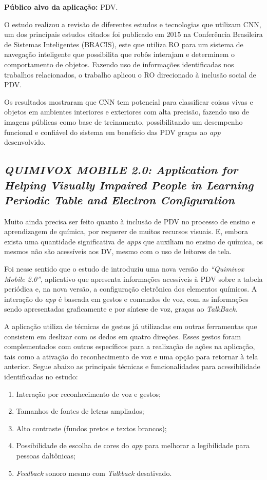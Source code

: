 \textbf{Público alvo da aplicação:} PDV\@.

O estudo realizou a revisão de diferentes estudos e tecnologias que utilizam CNN, um dos principais estudos citados
foi publicado em 2015 na Conferência Brasileira de Sistemas Inteligentes (BRACIS), este que utiliza RO para um sistema
de navegação inteligente que possibilita que robôs interajam e determinem o comportamento de objetos.
Fazendo uso de informações identificadas nos trabalhos relacionados, o trabalho aplicou o RO direcionado à inclusão social de PDV\@.

Os resultados mostraram que CNN tem potencial para classificar coisas vivas e objetos em ambientes interiores e exteriores com alta precisão, fazendo uso de imagens públicas
como base de treinamento, possibilitando um desempenho funcional e confiável do sistema em benefício das PDV graças ao \emph{app} desenvolvido.

\subsection{\emph{QUIMIVOX MOBILE 2.0: Application for Helping Visually Impaired People in Learning Periodic Table and Electron Configuration}}

Muito ainda precisa ser feito quanto à inclusão de PDV no processo de ensino e aprendizagem de química, por requerer de muitos recursos visuais.
E, embora exista uma quantidade significativa de \emph{apps} que auxiliam no ensino de química, os mesmos não são acessíveis aos DV, mesmo com o uso de leitores de tela.

Foi nesse sentido que o estudo de  introduziu uma nova versão do \emph{``Quimivox Mobile 2.0''},
aplicativo que apresenta informações acessíveis à PDV sobre a tabela periódica e, na nova versão, a configuração eletrônica
dos elementos químicos. A interação do \emph{app} é baseada em gestos e comandos de voz, com as informações sendo apresentadas
graficamente e por síntese de voz, graças ao \emph{TalkBack}.

A aplicação utiliza de técnicas de gestos já utilizadas em outras ferramentas que consistem em deslizar com os dedos em quatro
direções. Esses gestos foram complementados com outros específicos para a realização de ações na aplicação, tais como a ativação
do reconhecimento de voz e uma opção para retornar à tela anterior.
Segue abaixo as principais técnicas e funcionalidades para acessibilidade identificadas no estudo:

\begin{enumerate}
    \item Interação por reconhecimento de voz e gestos;
    \item Tamanhos de fontes de letras ampliados;
    \item Alto contraste (fundos pretos e textos brancos);
    \item Possibilidade de escolha de cores do \emph{app} para melhorar a legibilidade para pessoas daltônicas;
    \item \emph{Feedback} sonoro mesmo com \emph{Talkback} desativado.
\end{enumerate}


